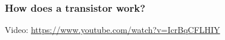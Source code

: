 

\subtitle{Technik Klasse E 13: \\
          Transistor \& Verstärker \\[2em]}
\date{Stand 25.11.2015}


\begin{frame}
\frametitle{How does a transistor work?}
    \begin{center}
Video: \url{https://www.youtube.com/watch?v=IcrBqCFLHIY}
	\end{center}
\end{frame}
